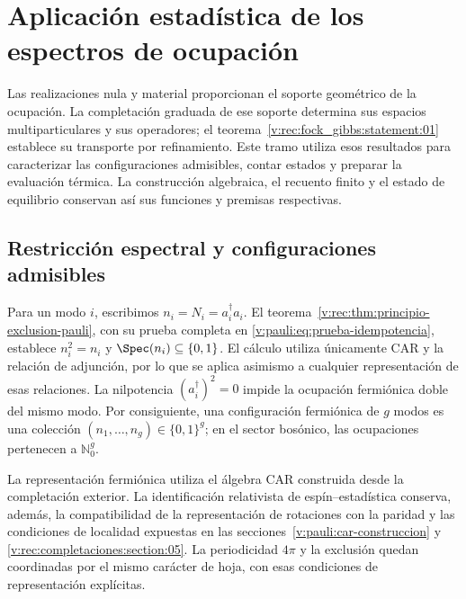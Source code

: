\section{Aplicación estadística de los espectros de ocupación}
\label{v:rec:chap:ocupacion-estadistica}

Las realizaciones nula y material proporcionan el soporte geométrico de la
ocupación. La completación graduada de ese soporte determina sus espacios
multiparticulares y sus operadores; el
teorema~\ref{v:rec:fock_gibbs:statement:01} establece su transporte por
refinamiento. Este tramo utiliza esos resultados para caracterizar las
configuraciones admisibles, contar estados y preparar la evaluación térmica.
La construcción algebraica, el recuento finito y el estado de equilibrio
conservan así sus funciones y premisas respectivas.

\subsection{Restricción espectral y configuraciones admisibles}
\label{v:rec:pauli:section:02}

Para un modo \(i\), escribimos \(n_i=N_i=a_i^\dagger a_i\). El
teorema~\ref{v:rec:thm:principio-exclusion-pauli}, con su prueba completa en
\eqref{v:pauli:eq:prueba-idempotencia}, establece
\(n_i^2=n_i\) y \(\Spec(n_i)\subseteq\{0,1\}\). El cálculo utiliza
únicamente CAR y la relación de adjunción, por lo que se aplica asimismo
a cualquier representación de esas relaciones. La nilpotencia
\((a_i^\dagger)^2=0\) impide la ocupación fermiónica doble del mismo modo.
Por consiguiente, una configuración fermiónica de \(g\) modos es una
colección \((n_1,\ldots,n_g)\in\{0,1\}^g\); en el sector bosónico, las
ocupaciones pertenecen a \(\mathbb N_0^g\).

La representación fermiónica utiliza el álgebra CAR construida desde la
completación exterior. La identificación relativista de
espín--estadística conserva, además, la compatibilidad de la representación
de rotaciones con la paridad y las condiciones de localidad expuestas en
las secciones~\ref{v:pauli:car-construccion} y
\ref{v:rec:completaciones:section:05}. La periodicidad \(4\pi\) y la
exclusión quedan coordinadas por el mismo carácter de hoja, con esas
condiciones de representación explícitas.

